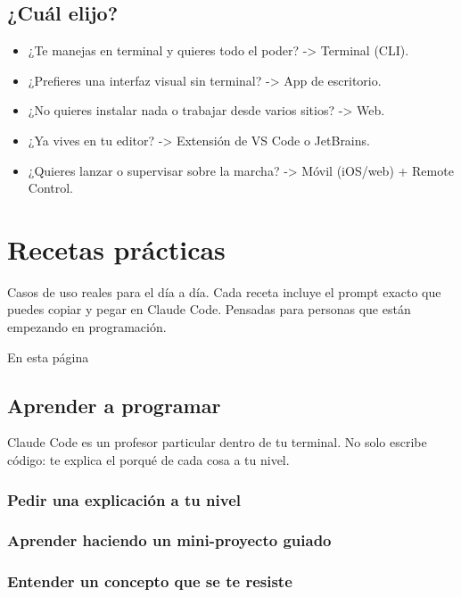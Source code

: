 \documentclass[11pt,a4paper]{book}
\begin{document}
\section{¿Cuál elijo?}
\begin{itemize}\item ¿Te manejas en terminal y quieres todo el poder? -> Terminal (CLI).\end{itemize}
\begin{itemize}\item ¿Prefieres una interfaz visual sin terminal? -> App de escritorio.\end{itemize}
\begin{itemize}\item ¿No quieres instalar nada o trabajar desde varios sitios? -> Web.\end{itemize}
\begin{itemize}\item ¿Ya vives en tu editor? -> Extensión de VS Code o JetBrains.\end{itemize}
\begin{itemize}\item ¿Quieres lanzar o supervisar sobre la marcha? -> Móvil (iOS/web) + Remote Control.\end{itemize}
\chapter{Recetas prácticas}
Casos de uso reales para el día a día. Cada receta incluye el prompt exacto que puedes copiar y pegar en Claude Code. Pensadas para personas que están empezando en programación.

En esta página

\section{Aprender a programar}
Claude Code es un profesor particular dentro de tu terminal. No solo escribe código: te explica el porqué de cada cosa a tu nivel.

\subsection{Pedir una explicación a tu nivel}
\subsection{Aprender haciendo un mini-proyecto guiado}
\subsection{Entender un concepto que se te resiste}
\end{document}
